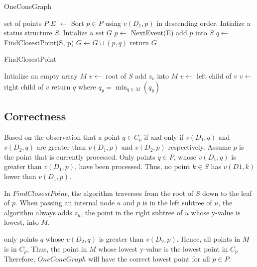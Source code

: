 \documentclass[12pt]{article}
\begin{document}
\begin{algorithm}[h]
  \caption{OneConeGraph}
  \begin{algorithmic}
    \Require set of points $P$
    \State $E$ $\leftarrow$ Sort $p \in P$ using $v(D_1,p)$ in descending order.
    \State Intialize a status structure $S$.
    \State Intialize a set $G$
        \State $p \leftarrow$ NextEvent(E)
        \State add $p$ into $S$
        \State $q \leftarrow$ FindClosestPoint(S, p)
        \State $G \leftarrow G \cup { (p,q) }$
    \EndWhile
    \State return $G$
  \end{algorithmic}
\end{algorithm}

\begin{algorithm}[h]
  \caption{FindClosestPoint}
  \begin{algorithmic}
    \State Intialize an empty array $M$
    \State $v \leftarrow$ root of $S$
            \State add $z_v$ into $M$
            \State $v \leftarrow$ left child of $v$
        \Else
            \State $v \leftarrow$ right child of $v$
        \EndIf
    \EndWhile
    \State return $q$ where $q_y = \min_{q \in M} (q_y)$
  \end{algorithmic}
\end{algorithm}

\subsection*{Correctness}
Based on the observation that a point $q \in C_p$ if and only if $v(D_1,q)$ and $v(D_2,q)$
are greater than $v(D_1,p)$ and $v(D_2,p)$ respectively. Assume $p$ is the point that 
is currently processed. Only points $q \in P$, whose $v(D_1,q)$ is greater than $v(D_1,p)$,
have been processed. Thus, no point $k \in S$ has $v(D1,k)$ lower than $v(D_1,p)$.

In $FindClosestPoint$, the algorithm traverses from the root of $S$ down to the leaf
of $p$. When passing an internal node $u$ and $p$ is in the left subtree of $u$,
the algorithm always adds $z_u$, the point in the right subtree of $u$  whose y-value is lowest, into $M$.

only points $q$ whose $v(D_2,q)$ is greater than $v(D_2,p)$. Hence, all points in $M$ is in $C_p$,
Thus, the point in $M$ whose lowest y-value is the lowest point in $C_p$ \\

\newpage
Therefore, $OneConeGraph$ will have the correct lowest point for all $p \in P$.
\end{document}
